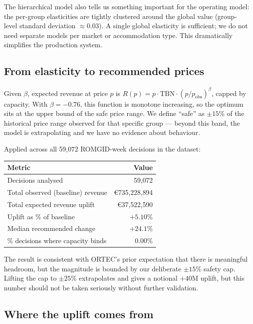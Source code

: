 \documentclass[11pt,a4paper]{article}
\begin{document}
The hierarchical model also tells us something important for the operating model: the per-group elasticities are tightly clustered around the global value (group-level standard deviation $\approx 0.03$). A single global elasticity is sufficient; we do not need separate models per market or accommodation type. This dramatically simplifies the production system.

\subsection{From elasticity to recommended prices}

Given $\beta$, expected revenue at price $p$ is $R(p) = p \cdot \mathrm{TBN} \cdot (p / p_{\text{obs}})^\beta$, capped by capacity. With $\beta = -0.76$, this function is monotone increasing, so the optimum sits at the upper bound of the safe price range. We define ``safe'' as $\pm 15\%$ of the historical price range observed for that specific group --- beyond this band, the model is extrapolating and we have no evidence about behaviour.

Applied across all 59{,}072 ROMGID-week decisions in the dataset:

\begin{center}
\small
\begin{tabular}{@{}lr@{}}
\toprule
\textbf{Metric} & \textbf{Value} \\
\midrule
Decisions analysed & 59{,}072 \\
Total observed (baseline) revenue & \euro{}735{,}228{,}894 \\
Total expected revenue uplift & \euro{}37{,}522{,}590 \\
Uplift as \% of baseline & $+5.10\%$ \\
Median recommended change & $+24.1\%$ \\
\% decisions where capacity binds & $0.00\%$ \\
\bottomrule
\end{tabular}
\end{center}

The result is consistent with ORTEC's prior expectation that there is meaningful headroom, but the magnitude is bounded by our deliberate $\pm 15\%$ safety cap. Lifting the cap to $\pm 25\%$ extrapolates and gives a notional $+40$M uplift, but this number should not be taken seriously without further validation.

\subsection{Where the uplift comes from}
\end{document}

